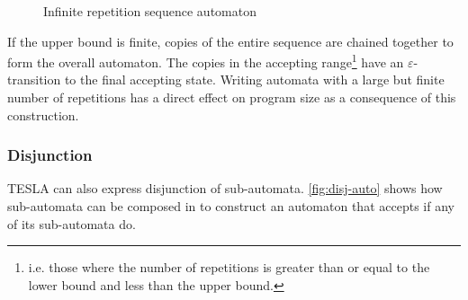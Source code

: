 \begin{figure}[ht]
  \centering
  \caption{Infinite repetition sequence automaton}
  \label{fig:seq-inf-auto}
\end{figure}

If the upper bound is finite, copies of the entire sequence are chained
together to form the overall automaton. The copies in the accepting
range\footnote{i.e. those where the number of repetitions is greater
than or equal to the lower bound and less than the upper bound.} have an
$\varepsilon$-transition to the final accepting state. Writing automata
with a large but finite number of repetitions has a direct effect on
program size as a consequence of this construction.

\subsubsection{Disjunction}

TESLA can also express disjunction of sub-automata.
\autoref{fig:disj-auto} shows how sub-automata can be composed in
 to construct an automaton that accepts if any of
its sub-automata do.

